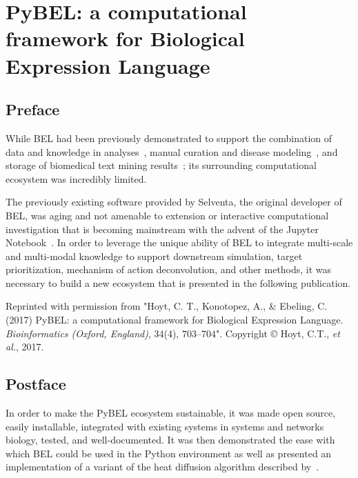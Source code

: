 \chapter{PyBEL: a computational framework for Biological Expression Language}
\label{ch:pybel}

\section*{Preface}

While \ac{BEL} had been previously demonstrated to support the combination of data and knowledge in analyses~\cite{Martin2012,Laifenfeld2012,Catlett2013,Martin2014,Vasilyev2014,Laifenfeld2014}, manual curation and disease modeling~\cite{Kodamullil2015,Irin2015,Naz2016,Karki2017,Emon2017,Domingo-Fernandez2017}, and storage of biomedical text mining results~\cite{Lai2016,Madan2016,Rastegar-Mojarad2016,Ravikumar2017,Ali2017}; its surrounding computational ecosystem was incredibly limited.

The previously existing software provided by Selventa, the original developer of BEL, was aging and not amenable to extension or interactive computational investigation that is becoming mainstream with the advent of the Jupyter Notebook~\cite{Kluyver2016}.
In order to leverage the unique ability of \ac{BEL} to integrate multi-scale and multi-modal knowledge to support downstream simulation, target prioritization, mechanism of action deconvolution, and other methods, it was necessary to build a new ecosystem that is presented in the following publication.

\vspace*{\fill}

Reprinted with permission from "Hoyt, C. T., Konotopez, A., \& Ebeling, C. (2017) PyBEL: a computational framework for Biological Expression Language. \textit{Bioinformatics (Oxford, England)}, 34(4), 703–704".
Copyright © Hoyt, C.T., \textit{et al.}, 2017.



\section*{Postface}

In order to make the PyBEL ecosystem sustainable, it was made open source, easily installable, integrated with existing systems in systems and networks biology, tested, and well-documented.
It was then demonstrated the ease with which \ac{BEL} could be used in the Python environment as well as presented an implementation of a variant of the heat diffusion algorithm described by~\cite{Leiserson2015}.

